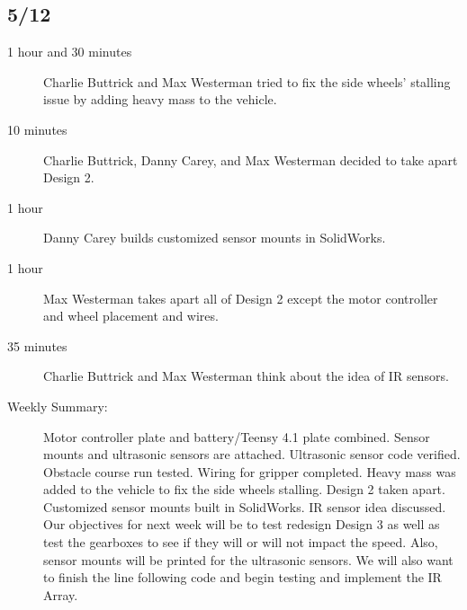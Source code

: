 \documentclass[11pt]{report}
\begin{document}
\begin{adjustwidth}{0.5cm}{0cm}
\vspace{-2.1em}\subsection*{5/12}
\begin{greylineformat}
\begin{description}
    \item [1 hour and 30 minutes] Charlie Buttrick and Max Westerman tried to fix the side wheels' stalling issue by adding heavy mass to the vehicle. 
    \item [10 minutes] Charlie Buttrick, Danny Carey, and Max Westerman decided to take apart Design 2.
    \item [1 hour] Danny Carey builds customized sensor mounts in SolidWorks. 
    \item [1 hour] Max Westerman takes apart all of Design 2 except the motor controller and wheel placement and wires. 
    \item [35 minutes] Charlie Buttrick and Max Westerman think about the idea of IR sensors. 
\end{description}\end{greylineformat}

\newpage
\begin{description}
    \item [Weekly Summary:]Motor controller plate and battery/Teensy 4.1 plate combined. Sensor mounts and ultrasonic sensors are attached. Ultrasonic sensor code verified. Obstacle course run tested. Wiring for gripper completed. Heavy mass was added to the vehicle to fix the side wheels stalling. Design 2 taken apart. Customized sensor mounts built in SolidWorks. \gls{IR} sensor idea discussed. Our objectives for next week will be to test redesign Design 3 as well as test the gearboxes to see if they will or will not impact the speed. Also, sensor mounts will be printed for the ultrasonic sensors. We will also want to finish the line following code and begin testing and implement the \gls{IR} Array.
\end{description}\vspace{0.5em}
\end{adjustwidth}
\end{document}
